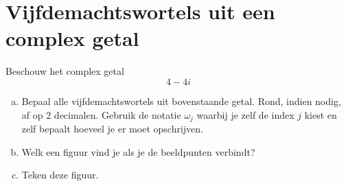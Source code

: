 \documentclass[12pt]{article}
\begin{document}
\section*{Vijfdemachtswortels uit een complex getal}

Beschouw het complex getal
$$4-4i$$                       %

\begin{enumerate}[(a)]
\item Bepaal alle vijfdemachtswortels uit bovenstaande getal. Rond, indien nodig, af op 2 decimalen. Gebruik de notatie $\omega_j$ waarbij je zelf de index $j$ kiest en zelf bepaalt hoeveel je er moet opschrijven.
\item Welk een figuur vind je als je de beeldpunten verbindt?
\item Teken deze figuur.
  \begin{center}
  \end{center}
\end{enumerate}
\end{document}
